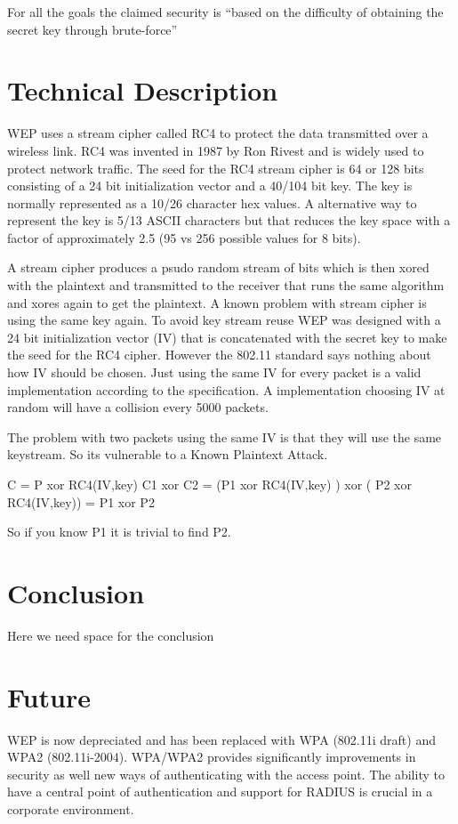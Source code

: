 \documentclass[twocolumn,11pt]{IEEEtran}
\begin{document}
For all the goals the claimed security is ``based on the difficulty of obtaining the secret key through brute-force'' \cite{IEEE:Fast}



\section {Technical Description}
\label{sec:technical_description}

WEP uses a stream cipher called RC4 to protect the data transmitted over a wireless link. RC4 was invented in 1987 by Ron Rivest and is widely used to protect network traffic. The seed for the RC4 stream cipher is 64 or 128 bits consisting of a 24 bit initialization vector and a 40/104 bit key. The key is normally represented as a 10/26 character hex values. A alternative way to represent the key is 5/13 ASCII characters but that reduces the key space with a factor of approximately 2.5 (95 vs 256 possible values for 8 bits).

A stream cipher produces a psudo random stream of bits which is then xored with the plaintext and transmitted to the receiver that runs the same algorithm and xores again to get the plaintext. A known problem with stream cipher is using the same key again. To avoid key stream reuse WEP was designed with a 24 bit initialization vector (IV) that is concatenated with the secret key to make the seed for the RC4 cipher. However the 802.11 standard says nothing about how IV should be chosen. Just using the same IV for every packet is a valid implementation according to the specification. A implementation choosing IV at random will have a collision every 5000 packets. 

The problem with two packets using the same IV is that they will use the same keystream. So its vulnerable to a Known Plaintext Attack.

C = P xor RC4(IV,key)
C1 xor C2 = (P1 xor RC4(IV,key) ) xor ( P2 xor RC4(IV,key)) = P1 xor P2

So if you know P1 it is trivial to find P2. 

\section {Conclusion}
\label{sec:conclusion}

Here we need space for the conclusion



\section {Future}
\label{sec:future}

WEP is now depreciated and has been replaced with WPA (802.11i draft) and WPA2 (802.11i-2004). WPA/WPA2 provides significantly improvements in security as well new ways of authenticating with the access point. The ability to have a central point  of authentication and support for RADIUS is crucial in a corporate environment.






\end{document}
